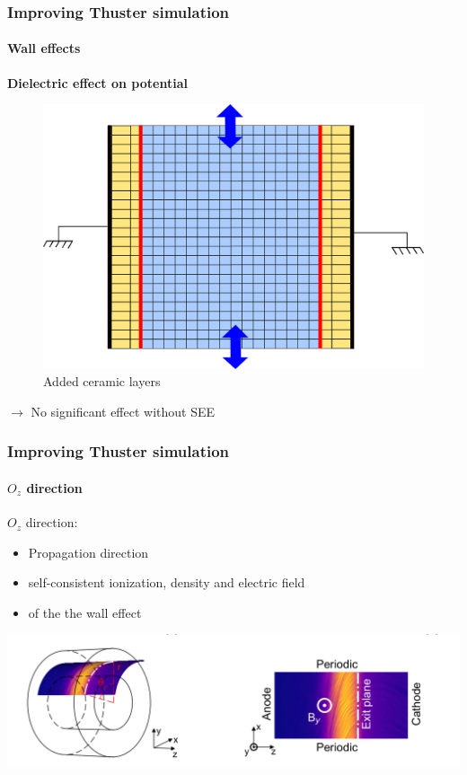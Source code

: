 \documentclass[sans, aspectratio=169]{beamer}
\begin{document}
\begin{frame} 
	\frametitle{Improving Thuster simulation} 
	\framesubtitle{ Wall effects} 

	\textbf{Dielectric effect on potential}
	\begin{figure}[hbtp]
		\centering
		\includegraphics[scale=0.4]{images/2D_diel_Rtheta.png}
		\caption{Added ceramic layers}
	\end{figure}
	
	$\rightarrow$ No significant effect without SEE
	
\end{frame}


\begin{frame} 
	\frametitle{Improving Thuster simulation} 
	\framesubtitle{ $O_z$ direction} 

	$O_z$ direction:
	\begin{itemize}
		\item Propagation direction
		\item self-consistent ionization, density and electric field
		\item of the the wall effect
	\end{itemize}		
	
	
	\includegraphics[scale=0.3]{images/ztheta.png} 
\end{frame}
\end{document}
